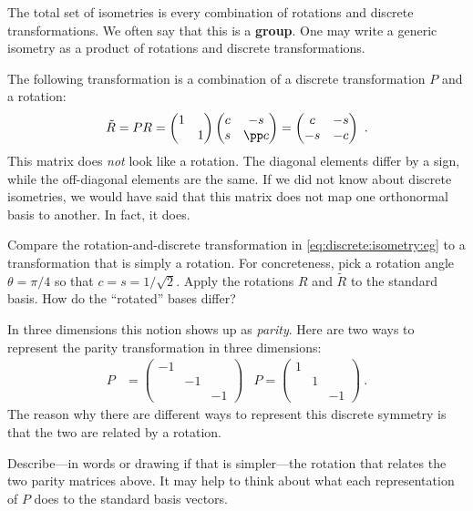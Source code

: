 \begin{subappendices}
The total set of isometries is every combination of rotations and discrete transformations. We often say that this is a \textbf{group}. One may write a generic isometry as a product of rotations and discrete transformations. 
\begin{example}
The following transformation is a combination of a discrete transformation $P$ and a rotation:
\begin{align}
    \tilde R = PR =
    \begin{pmatrix}
        1 & \\ 
        & 1 
    \end{pmatrix}
    \begin{pmatrix}
        c & -s\\ 
        s & \pp c
    \end{pmatrix}
    =
    \begin{pmatrix}
        c & -s\\ 
        -s & - c
    \end{pmatrix} \ .
    \label{eq:discrete:isometry:eg}
\end{align}
This matrix does \emph{not} look like a rotation. The diagonal elements differ by a sign, while the off-diagonal elements are the same. If we did not know about discrete isometries, we would have said that this matrix does not map one orthonormal basis to another. In fact, it does.
\end{example}
\begin{exercise}
Compare the rotation-and-discrete transformation in \eqref{eq:discrete:isometry:eg} to a transformation that is simply a rotation. For concreteness, pick a rotation angle $\theta = \pi/4$ so that $c=s=1/\sqrt{2}$. Apply the rotations $R$ and $\tilde R$ to the standard basis. How do the ``rotated'' bases differ?
\end{exercise}

In three dimensions this notion shows up as \emph{parity}. Here are two ways to represent the parity transformation in three dimensions:
\begin{align}
    P &=
    \begin{pmatrix}
        -1 & & \\
        & -1 & \\
        & & -1
    \end{pmatrix} 
    &
    P =
    \begin{pmatrix}
        1 & & \\
        & 1 & \\
        & & -1
    \end{pmatrix}
    \ .
\end{align}
The reason why there are different ways to represent this discrete symmetry is that the two are related by a rotation. 
\begin{exercise}
Describe---in words or drawing if that is simpler---the rotation that relates the two parity matrices above. It may help to think about what each representation of $P$ does to the standard basis vectors. 
\end{exercise}


\end{subappendices}
